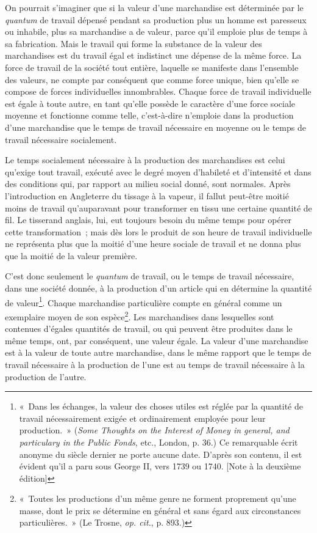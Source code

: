 \documentclass[french,twoside]{book} %
\begin{document}
On pourrait s’imaginer que si la valeur d’une marchandise est déterminée par le \emph{quantum} de travail dépensé pendant sa production plus un homme est paresseux ou inhabile, plus sa marchandise a de valeur, parce qu’il emploie plus de temps à sa fabrication. Mais le travail qui forme la substance de la valeur des marchandises est du travail égal et indistinct une dépense de la même force. La force de travail de la société tout entière, laquelle se manifeste dans l’ensemble des valeurs, ne compte par conséquent que comme force unique, bien qu’elle se compose de forces individuelles innombrables. Chaque force de travail individuelle est égale à toute autre, en tant qu’elle possède le caractère d’une force sociale moyenne et fonctionne comme telle, c’est-à-dire n’emploie dans la production d’une marchandise que le temps de travail nécessaire en moyenne ou le temps de travail nécessaire socialement.\par
Le temps socialement nécessaire à la production des marchandises est celui qu’exige tout travail, exécuté avec le degré moyen d’habileté et d’intensité et dans des conditions qui, par rapport au milieu social donné, sont normales. Après l’introduction en Angleterre du tissage à la vapeur, il fallut peut-être moitié moins de travail qu’auparavant pour transformer en tissu une certaine quantité de fil. Le tisserand anglais, lui, eut toujours besoin du même temps pour opérer cette transformation ; mais dès lors le produit de son heure de travail individuelle ne représenta plus que la moitié d’une heure sociale de travail et ne donna plus que la moitié de la valeur première.\par
C’est donc seulement le \emph{quantum} de travail, ou le temps de travail nécessaire, dans une société donnée, à la production d’un article qui en détermine la quantité de valeur\footnote{« Dans les échanges, la valeur des choses utiles est réglée par la quantité de travail nécessairement exigée et ordinairement employée pour leur production. » (\emph{Some Thoughts on the Interest of Money in general, and particulary in the Public Fonds}, etc., London, p. 36.) Ce remarquable écrit anonyme du siècle dernier ne porte aucune date. D’après son contenu, il est évident qu’il a paru sous George II, vers 1739 ou 1740. [Note à la deuxième édition]}. Chaque marchandise particulière compte en général comme un exemplaire moyen de son espèce\footnote{« Toutes les productions d’un même genre ne forment proprement qu’une masse, dont le prix se détermine en général et sans égard aux circonstances particulières. » (Le Trosne, \emph{op. cit.}, p. 893.)}. Les marchandises dans lesquelles sont contenues d’égales quantités de travail, ou qui peuvent être produites dans le même temps, ont, par conséquent, une valeur égale. La valeur d’une marchandise est à la valeur de toute autre marchandise, dans le même rapport que le temps de travail nécessaire à la production de l’une est au temps de travail nécessaire à la production de l’autre.\par
\end{document}
